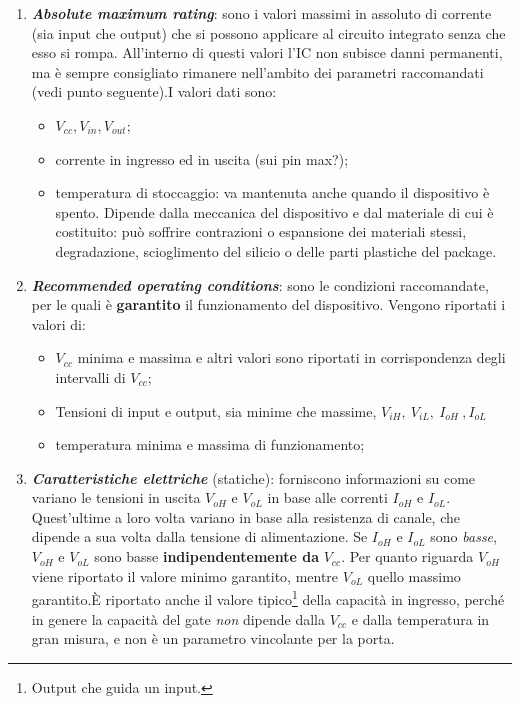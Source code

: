\documentclass[
]{book}
\providecommand{\tightlist}{%
  \setlength{\itemsep}{0pt}\setlength{\parskip}{0pt}}
\begin{document}
\begin{enumerate}
\def\labelenumi{\arabic{enumi})}
\tightlist
\item
  \textbf{\emph{Absolute maximum rating}}: sono i valori massimi in
  assoluto di corrente (sia input che output) che si possono applicare
  al circuito integrato senza che esso si rompa. All'interno di questi
  valori l'IC non subisce danni permanenti, ma è sempre consigliato
  rimanere nell'ambito dei parametri raccomandati (vedi punto
  seguente).\newline I valori dati sono:

  \begin{itemize}
  \tightlist
  \item
    \(V_{cc},V_{in}, V_{out}\);
  \item
    corrente in ingresso ed in uscita (sui pin max?);
  \item
    temperatura di stoccaggio: va mantenuta anche quando il dispositivo
    è spento. Dipende dalla meccanica del dispositivo e dal materiale di
    cui è costituito: può soffrire contrazioni o espansione dei
    materiali stessi, degradazione, scioglimento del silicio o delle
    parti plastiche del package.
  \end{itemize}
\item
  \textbf{\emph{Recommended operating conditions}}: sono le condizioni
  raccomandate, per le quali è \textbf{garantito} il funzionamento del
  dispositivo. Vengono riportati i valori di:

  \begin{itemize}
  \tightlist
  \item
    \(V_{cc}\) minima e massima e altri valori sono riportati in
    corrispondenza degli intervalli di \(V_{cc}\);
  \item
    Tensioni di input e output, sia minime che massime,
    \(V_{iH}, \: V_{iL},\:I_{oH}\:, I_{oL}\)
  \item
    temperatura minima e massima di funzionamento;
  \end{itemize}
\item
  \textbf{\emph{Caratteristiche elettriche}} (statiche): forniscono
  informazioni su come variano le tensioni in uscita \(V_{oH}\) e
  \(V_{oL}\) in base alle correnti \(I_{oH}\) e \(I_{oL}\). Quest'ultime
  a loro volta variano in base alla resistenza di canale, che dipende a
  sua volta dalla tensione di alimentazione. Se \(I_{oH}\) e \(I_{oL}\)
  sono \emph{basse},\(V_{oH}\) e \(V_{oL}\) sono basse
  \textbf{indipendentemente da} \(V_{cc}\). Per quanto riguarda
  \(V_{oH}\) viene riportato il valore minimo garantito, mentre
  \(V_{oL}\) quello massimo garantito.\newline È riportato anche il
  valore tipico\footnote{Output che guida un input.} della capacità in
  ingresso, perché in genere la capacità del gate \emph{non} dipende
  dalla \(V_{cc}\) e dalla temperatura in gran misura, e non è un
  parametro vincolante per la porta.


\end{enumerate}
\end{document}
